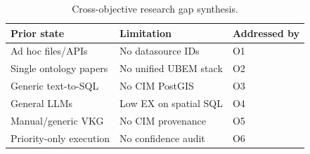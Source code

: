 \begin{table}[t]
  \centering
  \caption{Cross-objective research gap synthesis.}
  \label{tab:gap}
  \small
  \begin{tabular}{p{2.2cm}p{3.2cm}p{2.2cm}}
    \toprule
    Prior state & Limitation & Addressed by \\
    \midrule
    Ad hoc files/APIs & No datasource IDs & O1 \\
    Single ontology papers & No unified UBEM stack & O2 \\
    Generic text-to-SQL & No CIM PostGIS & O3 \\
    General LLMs & Low EX on spatial SQL & O4 \\
    Manual/generic VKG & No CIM provenance & O5 \\
    Priority-only execution & No confidence audit & O6 \\
    \bottomrule
  \end{tabular}
\end{table}
